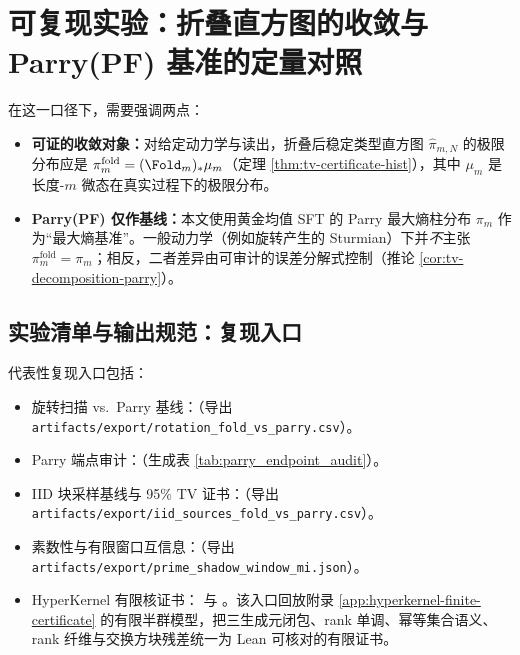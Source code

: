 \section{可复现实验：折叠直方图的收敛与 Parry(PF) 基准的定量对照}\label{sec:experiments}



在这一口径下，需要强调两点：
\begin{itemize}
  \item \textbf{可证的收敛对象：}对给定动力学与读出，折叠后稳定类型直方图 $\hat{\pi}_{m,N}$ 的极限分布应是 $\pi_m^{\mathrm{fold}}=(\Fold_m)_*\mu_m$（定理 \ref{thm:tv-certificate-hist}），其中 $\mu_m$ 是长度-$m$ 微态在真实过程下的极限分布。
  \item \textbf{Parry(PF) 仅作基线：}本文使用黄金均值 SFT 的 Parry 最大熵柱分布 $\pi_m$ 作为“最大熵基准”。一般动力学（例如旋转产生的 Sturmian）下并\emph{不}主张 $\pi_m^{\mathrm{fold}}=\pi_m$；相反，二者差异由可审计的误差分解式控制（推论 \ref{cor:tv-decomposition-parry}）。
\end{itemize}

\subsection{实验清单与输出规范：复现入口}\label{subsec:experiments-manifest}


代表性复现入口包括：
\begin{itemize}
  \item 旋转扫描 vs.\ Parry 基线：（导出 \texttt{artifacts/export/rotation\_fold\_vs\_parry.csv}）。
  \item Parry 端点审计：（生成表 \ref{tab:parry_endpoint_audit}）。
  \item IID 块采样基线与 95\% TV 证书：（导出 \texttt{artifacts/export/iid\_sources\_fold\_vs\_parry.csv}）。
  \item 素数性与有限窗口互信息：（导出 \texttt{artifacts/export/prime\_shadow\_window\_mi.json}）。
  \item HyperKernel 有限核证书： 与 。该入口回放附录 \ref{app:hyperkernel-finite-certificate} 的有限半群模型，把三生成元闭包、rank 单调、幂等集合语义、rank 纤维与交换方块残差统一为 Lean 可核对的有限证书。
\end{itemize}

